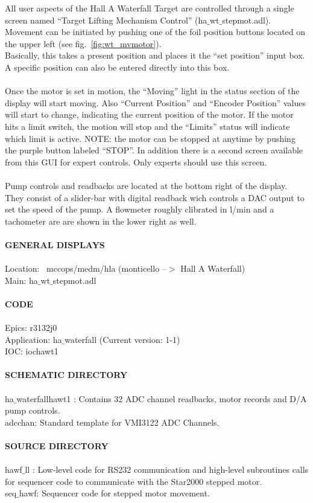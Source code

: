All user aspects of the Hall A Waterfall Target are controlled through
a single screen named {}``Target Lifting Mechanism Control'' (ha$\_$wt$\_$stepmot.adl).\\
 Movement can be initiated by pushing one of the foil position buttons
located on the upper left (see fig.~\ref{fig:wt_mvmotor}).\\
 Basically, this takes a present position and places it the {}``set
position'' input box. A specific position can also be entered directly
into this box.\\
\\
 Once the motor is set in motion, the {}``Moving'' light in the
status section of the display will start moving. Also {}``Current
Position'' and {}``Encoder Position'' values will start to change,
indicating the current position of the motor. If the motor hits a
limit switch, the motion will stop and the {}``Limits'' status will
indicate which limit is active. NOTE: the motor can be stopped at
anytime by pushing the purple button labeled {}``STOP''. In addition
there is a second screen available from this GUI for expert controls.
Only experts should use this screen.\\
\\
 Pump controls and readbacks are located at the bottom right of the
display. They consist of a slider-bar with digital readback wich controls
a DAC output to set the speed of the pump. A flowmeter roughly clibrated
in l/min and a tachometer are are shown in the lower right as well.\\
\\
 \textbf{GENERAL DISPLAYS}\\
\\
 Location: ~mccops/medm/hla (monticello --$>$ Hall A Waterfall)
\\
 Main: ha$\_$wt$\_$stepmot.adl \\
\\
 \textbf{CODE}\\
\\
 Epics: r3132j0 \\
 Application: ha$\_$waterfall (Current version: 1-1) \\
 IOC: iochawt1 \\
\\
 \textbf{SCHEMATIC DIRECTORY}\\
\\
 ha$\_$waterfallhawt1 : Contains 32 ADC channel readbacks, motor
records and D/A pump controls.\\
 adcchan: Standard template for VMI3122 ADC Channels.\\
\\
 \textbf{SOURCE DIRECTORY}\\
\\
 hawf$\_$ll : Low-level code for RS232 communication and high-level
subroutines calls for sequencer code to communicate with the Star2000
stepped motor.\\
 seq$\_$hawf: Sequencer code for stepped motor movement.


